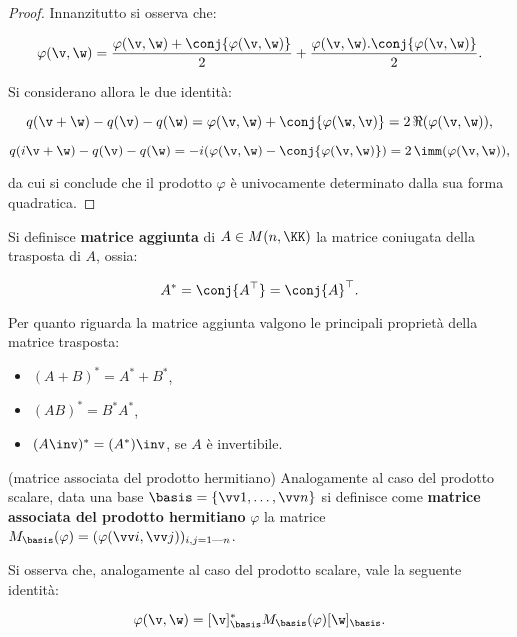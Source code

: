 \begin{proof}
	Innanzitutto si osserva che:
	
	\[ \varphi(\v, \w) = \frac{\varphi(\v, \w) + \conj{\varphi(\v, \w)}}{2} +  \frac{\varphi(\v, \w) . \conj{\varphi(\v, \w)}}{2}. \]
	
	\vskip 0.05in
	
	Si considerano allora le due identità:
	
	\[ q(\v + \w) - q(\v) - q(\w) =
	\varphi(\v, \w) + \conj{\varphi(\w, \v)} = 2 \, \Re(\varphi(\v, \w)), \]
	
	\[ q(i\v + \w) - q(\v) - q(\w) = -i(\varphi(\v, \w) - \conj{\varphi(\v, \w)}) = 2 \, \imm(\varphi(\v, \w)), \]
	
	\vskip 0.05in
	
	da cui si conclude che il prodotto $\varphi$ è univocamente
	determinato dalla sua forma quadratica.
\end{proof}

\begin{definition}
	Si definisce \textbf{matrice aggiunta} di $A \in M(n, \KK)$ la matrice coniugata della trasposta di $A$, ossia:
	
	\[ A^* = \conj{A^\top} = \conj{A}^\top. \]
\end{definition}

\begin{remark}
	Per quanto riguarda la matrice aggiunta valgono le principali proprietà della matrice trasposta:
	
	\begin{itemize}
		\item $(A + B)^* = A^* + B^*$,
		\item $(AB)^* = B^* A^*$,
		\item $(A\inv)^* = (A^*)\inv$, se $A$ è invertibile.
	\end{itemize}
\end{remark}


\begin{definition} (matrice associata del prodotto hermitiano) Analogamente
	al caso del prodotto scalare, data una base $\basis = \{\vv 1, \ldots, \vv n\}$ si definisce
	come \textbf{matrice associata del prodotto hermitiano} $\varphi$
	la matrice $M_\basis(\varphi) = (\varphi(\vv i, \vv j))_{i,j = 1 \textrm{---} n}$.
\end{definition}

\begin{remark}
	Si osserva che, analogamente al caso del prodotto scalare, vale
	la seguente identità:
	
	\[ \varphi(\v, \w) = [\v]_\basis^* M_\basis(\varphi) [\w]_\basis. \]
\end{remark}

